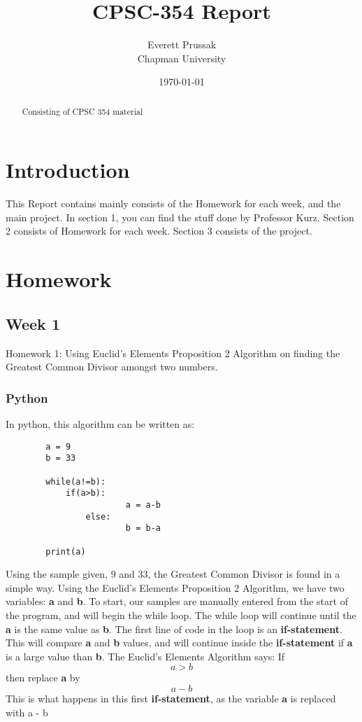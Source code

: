 \documentclass{article}
\title{CPSC-354 Report}
\author{Everett Prussak  \\ Chapman University}
\date{\today}
\theoremstyle{theorem}
\theoremstyle{definition}
\theoremstyle{remark}
\begin{document}
\maketitle

\begin{abstract}
Consisting of CPSC 354 material
\end{abstract}

\tableofcontents

\section{Introduction}\label{intro}

This Report contains mainly consists of the Homework for each week, and the main project. In section 1, you can find the stuff done by Professor Kurz. Section 2 consists of Homework for each week. Section 3 consists of the project.

\section{Homework}

\subsection{Week 1}

Homework 1: Using Euclid's Elements Proposition 2 Algorithm on finding the Greatest Common Divisor amongst two numbers.

\subsubsection{Python}
In python, this algorithm can be written as:
\begin{verbatim}
		a = 9
		b = 33

		while(a!=b):
   			if(a>b):
        				a = a-b
    			else:
        				b = b-a
    
		print(a)
\end{verbatim}

Using the sample given, 9 and 33, the Greatest Common Divisor is found in a simple way. Using the Euclid's Elements Proposition 2 Algorithm, we have two variables: \textbf{a} and \textbf{b}. To start, our samples are manually entered from the start of the program, and will begin the while loop. The while loop will continue until the \textbf{a} is the same value as \textbf{b}. The first line of code in the loop is an \textbf{if-statement}. This will compare \textbf{a} and \textbf{b} values, and will continue inside the \textbf{if-statement} if \textbf{a} is a large value than \textbf{b}. The Euclid's Elements Algorithm says: If \[a > b\] then replace \textbf{a} by \[a - b\]This is what happens in this first \textbf{if-statement}, as the variable \textbf{a} is replaced with a - b \medskip\noindent
\medskip\noindent
\end{document}

